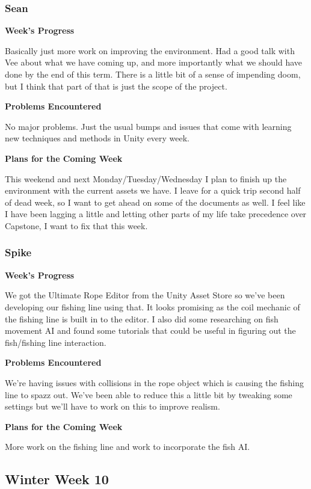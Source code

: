 \documentclass[10pt,journal,compsoc,onecolumn, draftclsnofoot]{IEEEtran}
\begin{document}
\subsubsection{Sean}
\noindent \textbf{Week's Progress}

Basically just more work on improving the environment. Had a good talk with Vee about what we have coming up, and more importantly what we should have done by the end of this term. There is a little bit of a sense of impending doom, but I think that part of that is just the scope of the project.

\noindent \textbf{Problems Encountered}

No major problems. Just the usual bumps and issues that come with learning new techniques and methods in Unity every week.

\noindent \textbf{Plans for the Coming Week}

This weekend and next Monday/Tuesday/Wednesday I plan to finish up the environment with the current assets we have. I leave for a quick trip second half of dead week, so I want to get ahead on some of the documents as well. I feel like I have been lagging a little and letting other parts of my life take precedence over Capstone, I want to fix that this week.

\subsubsection{Spike}
\noindent \textbf{Week's Progress}

We got the Ultimate Rope Editor from the Unity Asset Store so we've been developing our fishing line using that. It looks promising as the coil mechanic of the fishing line is built in to the editor. I also did some researching on fish movement AI and found some tutorials that could be useful in figuring out the fish/fishing line interaction.

\noindent \textbf{Problems Encountered}

We're having issues with collisions in the rope object which is causing the fishing line to spazz out. We've been able to reduce this a little bit by tweaking some settings but we'll have to work on this to improve realism.

\noindent \textbf{Plans for the Coming Week}

More work on the fishing line and work to incorporate the fish AI.

\subsection{Winter Week 10}
\end{document}
